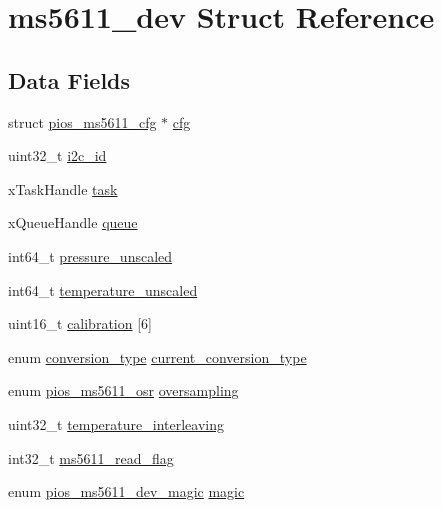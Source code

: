 \hypertarget{structms5611__dev}{\section{ms5611\-\_\-dev \-Struct \-Reference}
\label{structms5611__dev}
}
\subsection*{\-Data \-Fields}
\begin{DoxyCompactItemize}
\item 
struct \hyperlink{structpios__ms5611__cfg}{pios\-\_\-ms5611\-\_\-cfg} $\ast$ \hyperlink{structms5611__dev_a574b60b9bc78dd7806922d127ef46f02}{cfg}
\item 
uint32\-\_\-t \hyperlink{structms5611__dev_a6a0abf07d8e11d823c152aed1a7cbf76}{i2c\-\_\-id}
\item 
x\-Task\-Handle \hyperlink{structms5611__dev_a1c3007a7e12067eb6c4b2e42d0991f69}{task}
\item 
x\-Queue\-Handle \hyperlink{structms5611__dev_a72daf619c834a91f065403ba600b79d5}{queue}
\item 
int64\-\_\-t \hyperlink{structms5611__dev_a06bd507d0e8ff5e0cb6ac32bea05061c}{pressure\-\_\-unscaled}
\item 
int64\-\_\-t \hyperlink{structms5611__dev_ae7a92929f9d2649ee5569f6f7b3227ed}{temperature\-\_\-unscaled}
\item 
uint16\-\_\-t \hyperlink{structms5611__dev_a70397164fa20e861a6d63d2662398656}{calibration} \mbox{[}6\mbox{]}
\item 
enum \hyperlink{group___p_i_o_s___m_s5611_ga519b74aaa0203f0671cd8223b8db250a}{conversion\-\_\-type} \hyperlink{structms5611__dev_aa8a4e5f38a07817e999f55e10263a13b}{current\-\_\-conversion\-\_\-type}
\item 
enum \hyperlink{group___p_i_o_s___m_s5611_gab2c6484befa4b5993218d392d4db0bd3}{pios\-\_\-ms5611\-\_\-osr} \hyperlink{structms5611__dev_a0283041db42336e9ebe601eba710bdb3}{oversampling}
\item 
uint32\-\_\-t \hyperlink{structms5611__dev_afc179b4b564d92758f6ae8028f900a0d}{temperature\-\_\-interleaving}
\item 
int32\-\_\-t \hyperlink{structms5611__dev_a207a039805c1ce6f2751655e7d5f7301}{ms5611\-\_\-read\-\_\-flag}
\item 
enum \hyperlink{group___p_i_o_s___m_s5611_ga3d4540192eb752517e6fc8aff70a97a8}{pios\-\_\-ms5611\-\_\-dev\-\_\-magic} \hyperlink{structms5611__dev_af378d71dd80bc5c444c6a3516036664f}{magic}
\end{DoxyCompactItemize}


